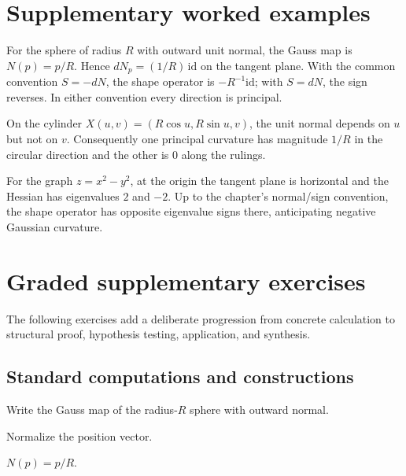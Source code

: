 \section{Supplementary worked examples}
\label{sec:vii16-pedagogy}

\begin{example}\label{ex:vii16-ped-01}
For the sphere of radius \(R\) with outward unit normal, the Gauss map is \(N(p)=p/R\).  Hence \(dN_p=(1/R)\,\mathrm{id}\) on the tangent plane.  With the common convention \(S=-dN\), the shape operator is \(-R^{-1}\mathrm{id}\); with \(S=dN\), the sign reverses.  In either convention every direction is principal.
\end{example}

\begin{example}\label{ex:vii16-ped-02}
On the cylinder \(X(u,v)=(R\cos u,R\sin u,v)\), the unit normal depends on \(u\) but not on \(v\).  Consequently one principal curvature has magnitude \(1/R\) in the circular direction and the other is \(0\) along the rulings.
\end{example}

\begin{example}\label{ex:vii16-ped-03}
For the graph \(z=x^2-y^2\), at the origin the tangent plane is horizontal and the Hessian has eigenvalues \(2\) and \(-2\).  Up to the chapter's normal/sign convention, the shape operator has opposite eigenvalue signs there, anticipating negative Gaussian curvature.
\end{example}

\section{Graded supplementary exercises}
The following exercises add a deliberate progression from concrete calculation to structural proof, hypothesis testing, application, and synthesis.

\subsection*{Standard computations and constructions}

\begin{exercise}\label{exr:vii16-ped-01}
Write the Gauss map of the radius-\(R\) sphere with outward normal.
\end{exercise}
\begin{hint}
Normalize the position vector.
\end{hint}
\begin{solution}
\(N(p)=p/R\).
\end{solution}


